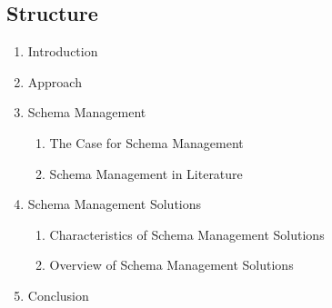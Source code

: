 \subsection{Structure}

\begin{enumerate}
  \item Introduction
  \item Approach
  \item Schema Management
        \begin{enumerate}
          \item The Case for Schema Management
          \item Schema Management in Literature
        \end{enumerate}
  \item Schema Management Solutions
        \begin{enumerate}
          \item Characteristics of Schema Management Solutions
          \item Overview of Schema Management Solutions
        \end{enumerate}
  \item Conclusion
\end{enumerate}